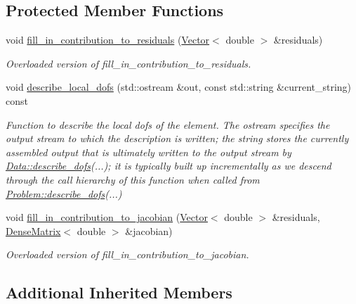 \subsection*{Protected Member Functions}
\begin{DoxyCompactItemize}
\item 
void \hyperlink{classoomph_1_1ProjectableElement_aeb0de899b7a5c7f498b2206ab00ef786}{fill\+\_\+in\+\_\+contribution\+\_\+to\+\_\+residuals} (\hyperlink{classoomph_1_1Vector}{Vector}$<$ double $>$ \&residuals)
\begin{DoxyCompactList}\small\item\em Overloaded version of fill\+\_\+in\+\_\+contribution\+\_\+to\+\_\+residuals. \end{DoxyCompactList}\item 
void \hyperlink{classoomph_1_1ProjectableElement_a9e7e6d213f5e28d4b1e91433d4efb74c}{describe\+\_\+local\+\_\+dofs} (std\+::ostream \&out, const std\+::string \&current\+\_\+string) const
\begin{DoxyCompactList}\small\item\em Function to describe the local dofs of the element. The ostream specifies the output stream to which the description is written; the string stores the currently assembled output that is ultimately written to the output stream by \hyperlink{classoomph_1_1Data_a2dae16e2dcff9a40029f834c83364df5}{Data\+::describe\+\_\+dofs}(...); it is typically built up incrementally as we descend through the call hierarchy of this function when called from \hyperlink{classoomph_1_1Problem_abc103804eb319ae0b3d43870cc3e1eaf}{Problem\+::describe\+\_\+dofs}(...) \end{DoxyCompactList}\item 
void \hyperlink{classoomph_1_1ProjectableElement_a5b6894eda403bd2b9d2cf1e0314d7a23}{fill\+\_\+in\+\_\+contribution\+\_\+to\+\_\+jacobian} (\hyperlink{classoomph_1_1Vector}{Vector}$<$ double $>$ \&residuals, \hyperlink{classoomph_1_1DenseMatrix}{Dense\+Matrix}$<$ double $>$ \&jacobian)
\begin{DoxyCompactList}\small\item\em Overloaded version of fill\+\_\+in\+\_\+contribution\+\_\+to\+\_\+jacobian. \end{DoxyCompactList}\end{DoxyCompactItemize}
\subsection*{Additional Inherited Members}


